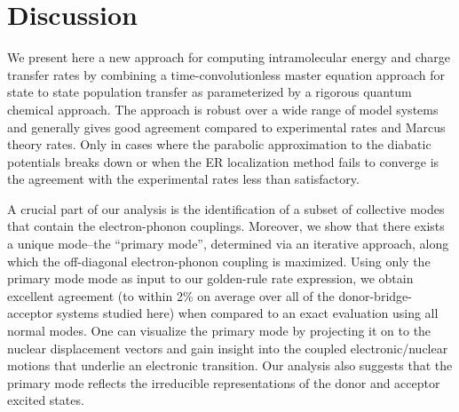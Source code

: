 \section{Discussion}

We present here a new approach for computing intramolecular energy and charge transfer rates
by combining a time-convolutionless master equation approach for state to state population transfer as parameterized
by  a rigorous quantum chemical approach.   The approach is robust over a wide range of model systems and
generally gives good agreement compared to experimental rates and Marcus theory rates.
Only in cases where the parabolic approximation to the diabatic potentials breaks down or when the ER localization method
fails to converge is the agreement with the experimental rates less than satisfactory.

A crucial part of our analysis is the identification of a subset of collective modes that contain
the electron-phonon couplings.  Moreover, we show that there exists a unique mode--the ``primary mode'',
determined via an iterative
approach, along which  the off-diagonal electron-phonon coupling is maximized.   Using only the primary mode
mode as input to our golden-rule rate expression, we obtain excellent
agreement (to within 2\% on average over   all of the donor-bridge-acceptor systems studied here)
when compared to an exact evaluation using all normal modes.   One can visualize the primary mode by projecting it on to the
nuclear displacement vectors and gain insight into the coupled electronic/nuclear motions that underlie an electronic
transition.   Our analysis also suggests that the primary  mode reflects the irreducible representations of the
donor and acceptor excited states.

% 
% 






